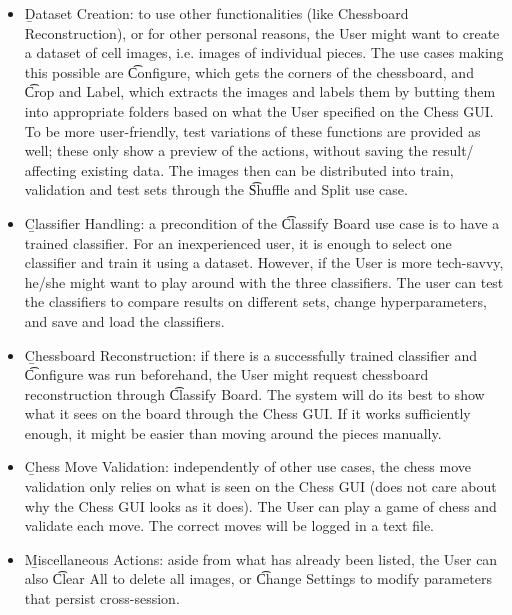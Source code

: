 \begin{itemize}
    \item \b{Dataset Creation}: to use other functionalities (like Chessboard Reconstruction), or for other personal reasons, the User might want to create a dataset of cell images, i.e. images of individual pieces. The use cases making this possible are \t{Configure}, which gets the corners of the chessboard, and \t{Crop and Label}, which extracts the images and labels them by butting them into appropriate folders based on what the User specified on the Chess GUI. To be more user-friendly, test variations of these functions are provided as well; these only show a preview of the actions, without saving the result/ affecting existing data. The images then can be distributed into train, validation and test sets through the \t{Shuffle and Split} use case.
    
    \item \b{Classifier Handling}: a precondition of the \t{Classify Board} use case is to have a trained classifier. For an inexperienced user, it is enough to select one classifier and train it using a dataset. However, if the User is more tech-savvy, he/she might want to play around with the three classifiers. The user can test the classifiers to compare results on different sets, change hyperparameters, and save and load the classifiers.

    \item \b{Chessboard Reconstruction}: if there is a successfully trained classifier and \t{Configure} was run beforehand, the User might request chessboard reconstruction through \t{Classify Board}. The system will do its best to show what it sees on the board through the Chess GUI. If it works sufficiently enough, it might be easier than moving around the pieces manually.

    \item \b{Chess Move Validation}: independently of other use cases, the chess move validation only relies on what is seen on the Chess GUI (does not care about why the Chess GUI looks as it does). The User can play a game of chess and validate each move. The correct moves will be logged in a text file.

    \item \b{Miscellaneous Actions}: aside from what has already been listed, the User can also \t{Clear All} to delete all images, or \t{Change Settings} to modify parameters that persist cross-session.
\end{itemize}

